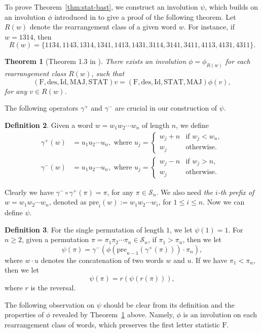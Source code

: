 \documentclass[12pt]{amsart}
\numberwithin{equation}{section}
\theoremstyle{plain}
\newtheorem{theorem}{Theorem}[section]
\theoremstyle{definition}
\newtheorem{Def}[theorem]{Definition}
\def\MAJ{\mathrm{MAJ}}
\def\STAT{\mathrm{STAT}}
\def\F{\mathrm{F}}
\def\des{\mathrm{des}}
\def\Id{\mathrm{Id}}
\def\pre{\mathrm{pre}}
\def\SS{\mathcal{S}}
\begin{document}
To prove Theorem~\ref{thm:stat-bast}, we construct an involution $\psi$, which builds on an involution $\phi$ introduced in \cite{FHV} to give a proof of the following theorem. Let $R(w)$ denote the rearrangement class of a given word $w$. For instance, if $w=1314$, then $$R(w)=\{1134, 1143, 1314, 1341, 1413, 1431, 3114, 3141, 3411, 4113, 4131, 4311\}.$$
\begin{theorem}[Theorem 1.3 in \cite{FHV}]
\label{thm:FHV}
There exists an involution $\phi=\phi_{R(w)}$ for each rearrangement class $R(w)$, such that $$(\F, \des, \Id, \MAJ, \STAT)v=(\F, \des, \Id, \STAT, \MAJ)\phi(v),$$ for any $v\in R(w)$.
\end{theorem}
The following operators $\gamma^{+}$ and $\gamma^{-}$ are crucial in our construction of $\psi$.
\begin{Def}
Given a word $w=w_1w_2\cdots w_n$ of length $n$, we define
\begin{align*}
\gamma^{+}(w) &=u_1u_2\cdots u_n, \text{ where } u_j=\begin{cases}
w_j+n & \text{if }w_j<w_n,\\
w_j & \text{otherwise}.
\end{cases}\\
\gamma^{-}(w) &=u_1u_2\cdots u_n, \text{ where } u_j=\begin{cases}
w_j-n & \text{if }w_j>n,\\
w_j & \text{otherwise}.
\end{cases}
\end{align*}
\end{Def}
Clearly we have $\gamma^-\circ\gamma^+(\pi)=\pi$, for any $\pi\in\SS_n$. We also need \emph{the $i$-th prefix of $w=w_1w_2\cdots w_n$}, denoted as $\pre_i(w):=w_1w_2\cdots w_i$, for $1\le i\le n$. Now we can define $\psi$.
\begin{Def}
For the single permutation of length $1$, we let $\psi(1)=1$. For $n\ge 2$, given a permutation $\pi=\pi_1\pi_2\cdots\pi_n\in\SS_n$, if $\pi_1>\pi_n$, then we let
$$\psi(\pi)=\gamma^-(\phi(\pre_{n-1}(\gamma^+(\pi)))\cdot \pi_n),$$
where $w\cdot u$ denotes the concatenation of two words $w$ and $u$. If we have $\pi_1<\pi_n$, then we let
$$\psi(\pi)=r(\psi(r(\pi))),$$
where $r$ is the reversal.
\end{Def}
The following observation on $\psi$ should be clear from its definition and the properties of $\phi$ revealed by Theorem~\ref{thm:FHV} above. Namely, $\phi$ is an involution on each rearrangement class of words, which preserves the first letter statistic $\F$.
\end{document}
